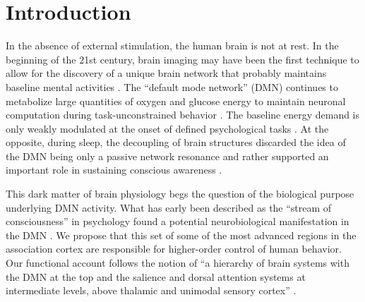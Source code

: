 \documentclass[10pt,letterpaper]{article}
\begin{document}

\section{Introduction}
%
In the absence of external stimulation, the human brain is not at rest.
In the beginning of the 21st century,
brain imaging may have been the first technique
to allow for the discovery of a unique brain network that probably maintains
baseline mental activities
\citep{raichle2001pnas, randy2008, bzdok2015resting}.
The ``default mode network'' (DMN) continues
to metabolize large quantities of
oxygen and glucose energy to maintain
neuronal computation
during task-unconstrained behavior
\citep{kenet2003spontaneously, fiser2004small}.
The baseline energy demand is only weakly modulated
at the onset of defined psychological tasks \citep{raichle_baseline}.
At the opposite, during sleep, the
decoupling of brain structures discarded the idea of the DMN being
only a passive network resonance and rather supported an
important role in sustaining conscious awareness \citep{horovitz2009decoupling}.



This dark matter of brain physiology \citep{raichle2006brain} begs the question
of the biological purpose underlying DMN activity.
What has early been described as the ``stream of consciousness''
in psychology \citep{james1890principles}
found a potential neurobiological manifestation
in the DMN
\citep{shul1997, raichle2001pnas}.
We propose that this set of some of the most advanced regions in
the association cortex \citep{mesulam1998sensation, margulies2016situating}
are responsible for higher-order control of human behavior.
Our functional account follows the notion of
``a hierarchy of brain systems with
the DMN at the top and the salience and dorsal attention systems
at intermediate levels, above thalamic and unimodal sensory
cortex'' \citep{carhart2010default}.
\end{document}
